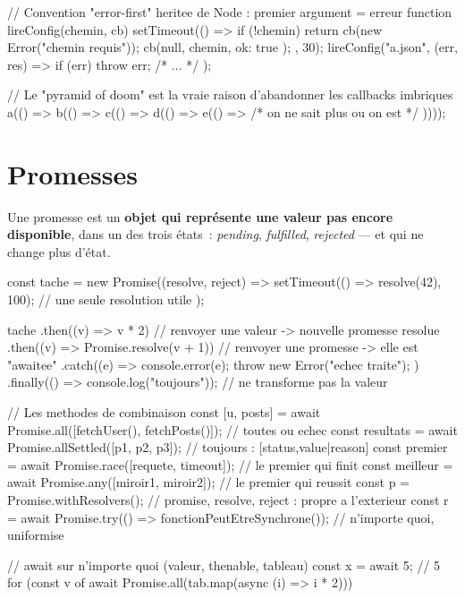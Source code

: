 \documentclass[12pt,a4paper,twoside,openright]{book}
\begin{document}
\begin{codejs}
// Convention "error-first" heritee de Node : premier argument = erreur
function lireConfig(chemin, cb) {
  setTimeout(() => {
    if (!chemin) return cb(new Error("chemin requis"));
    cb(null, { chemin, ok: true });
  }, 30);
}
lireConfig("a.json", (err, res) => { if (err) throw err; /* ... */ });

// Le "pyramid of doom" est la vraie raison d'abandonner les callbacks imbriques
a(() => b(() => c(() => d(() => e(() => { /* on ne sait plus ou on est */ }))));
\end{codejs}

\section{Promesses}

Une promesse est un \textbf{objet qui repr\'esente une valeur pas encore disponible}, dans un des
trois \'etats~: \emph{pending}, \emph{fulfilled}, \emph{rejected} --- et qui ne change plus d'\'etat.

\begin{codejs}
const tache = new Promise((resolve, reject) => {
  setTimeout(() => resolve(42), 100);           // une seule resolution utile
});

tache
  .then((v) => v * 2)              // renvoyer une valeur -> nouvelle promesse resolue
  .then((v) => Promise.resolve(v + 1))   // renvoyer une promesse -> elle est "awaitee"
  .catch((e) => { console.error(e); throw new Error("echec traite"); })
  .finally(() => console.log("toujours"));   // ne transforme pas la valeur

// Les methodes de combinaison
const [u, posts] = await Promise.all([fetchUser(), fetchPosts()]);   // toutes ou echec
const resultats = await Promise.allSettled([p1, p2, p3]);  // toujours : [{status,value|reason}]
const premier = await Promise.race([requete, timeout]);            // le premier qui finit
const meilleur = await Promise.any([miroir1, miroir2]);            // le premier qui reussit
const p = Promise.withResolvers();            // {promise, resolve, reject} : propre a l'exterieur
const r = await Promise.try(() => fonctionPeutEtreSynchrone());    // n'importe quoi, uniformise

// await sur n'importe quoi (valeur, thenable, tableau)
const x = await 5;                 // 5
for (const v of await Promise.all(tab.map(async (i) => i * 2))) {}
\end{codejs}
\end{document}
